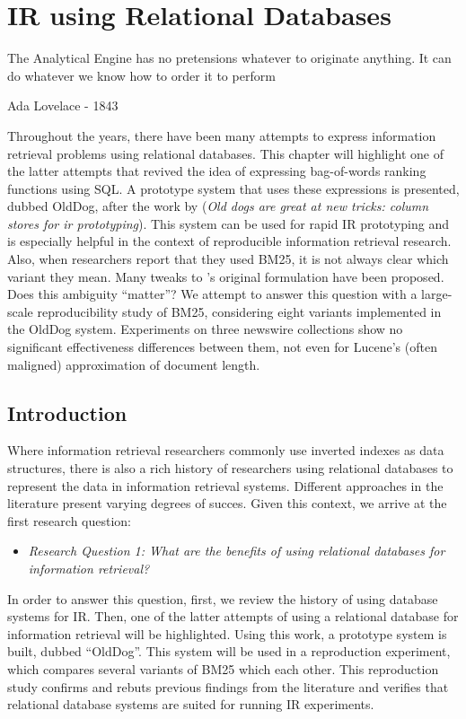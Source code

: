 \chapter{IR using Relational Databases}
\label{ir-using-relational-databases}
\epigraph{The Analytical Engine has no pretensions whatever to originate anything. It can do whatever we know how to order it to perform}{Ada Lovelace - 1843}

\begin{Abstract}
	\begin{changemargin}{1cm}{1cm}
		Throughout the years, there have been many attempts to express information retrieval problems using relational databases. This chapter will highlight one of the latter attempts that revived the idea of expressing bag-of-words ranking functions using SQL. A prototype system that uses these expressions is presented, dubbed OldDog, after the work by \citeauthor{OldDog} (\emph{Old dogs are great at new tricks: column stores for ir prototyping}). This system can be used for rapid IR prototyping and is especially helpful in the context of reproducible information retrieval research.
		Also, when researchers report that they used BM25, it is not always clear which variant they mean. Many tweaks to \citeauthor{bm25-robertson}'s original formulation have been proposed. Does this ambiguity ``matter''? We attempt to answer this question with a large-scale reproducibility study of BM25, considering eight variants implemented in the OldDog system. Experiments on three newswire collections show no significant effectiveness differences between them, not even for Lucene's (often maligned) approximation of document length.
	\end{changemargin}
\end{Abstract}

\section{Introduction}
Where information retrieval researchers commonly use inverted indexes as data structures, there is also a rich history of researchers using relational databases to represent the data in information retrieval systems. Different approaches in the literature present varying degrees of succes. Given this context, we arrive at the first research question: 
\begin{itemize}  
	\item \emph{Research Question 1: What are the benefits of using relational databases for information retrieval?} 
\end{itemize}
In order to answer this question, first, we review the history of using database systems for IR. Then, one of the latter attempts of using a relational database for information retrieval will be highlighted. Using this work, a prototype system is built, dubbed ``OldDog''. This system will be used in a reproduction experiment, which compares several variants of BM25 which each other. This reproduction study confirms and rebuts previous findings from the literature and verifies that relational database systems are suited for running IR experiments. 

